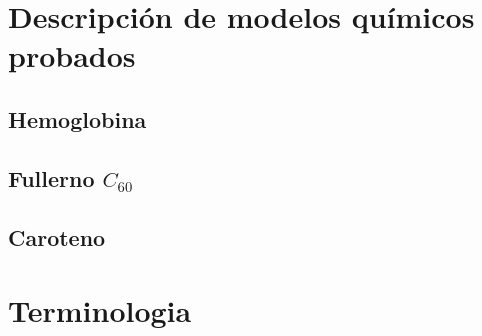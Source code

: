 \chapter{Descripci\'on de modelos qu\'imicos probados}

\section*{Hemoglobina}
\section*{Fullerno $C_{60}$}
\section*{Caroteno}

\chapter{Terminologia}
